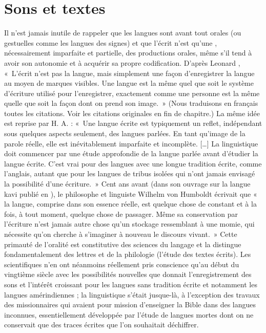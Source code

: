 \section{Sons et textes}\label{sec:1.1.2}

Il n’est jamais inutile de rappeler que les langues sont avant tout orales (ou gestuelles comme les langues des signes) et que l’écrit n’est qu’une , nécessairement imparfaite et partielle, des productions orales, même s’il tend à avoir son autonomie et à acquérir sa propre codification. D’après Leonard \citet{bloomfield1933language}, «~L’écrit n’est pas la langue, mais simplement une façon d’enregistrer la langue au moyen de marques visibles. Une langue est la même quel que soit le système d’écriture utilisé pour l’enregistrer, exactement comme une personne est la même quelle que soit la façon dont on prend son image.~» (Nous traduisons en français toutes les citations. Voir les citations originales en fin de chapitre.) La même idée est reprise par H. A. \citet{gleason1955introduction} : «~Une langue écrite est typiquement un reflet, indépendant sous quelques aspects seulement, des langues parlées. En tant qu’image de la parole réelle, elle est inévitablement imparfaite et incomplète. […] La linguistique doit commencer par une étude approfondie de la langue parlée avant d’étudier la langue écrite. C’est vrai pour des langues avec une longue tradition écrite, comme l’anglais, autant que pour les langues de tribus isolées qui n’ont jamais envisagé la possibilité d’une écriture.~» Cent ans avant (dans son ouvrage sur la langue kavi publié en \citeyear{humboldt1836uber}), le philosophe et linguiste Wilhelm von Humboldt écrivait que « la langue, comprise dans son essence réelle, est quelque chose de constant et à la fois, à tout moment, quelque chose de passager. Même sa conservation par l’écriture n’est jamais autre chose qu’un stockage ressemblant à une momie, qui nécessite qu’on cherche à s’imaginer à nouveau le discours vivant.~» Cette primauté de l’oralité est constitutive des sciences du langage et la distingue fondamentalement des lettres et de la philologie (l’étude des textes écrits). Les scientifiques n’en ont néanmoins réellement pris conscience qu’au début du vingtième siècle avec les possibilités nouvelles que donnait l’enregistrement des sons et l’intérêt croissant pour les langues sans tradition écrite et notamment les langues amérindiennes ; la linguistique s’était jusque-là, à l’exception des travaux des missionnaires qui avaient pour mission d’enseigner la Bible dans des langues inconnues, essentiellement développée par l’étude de langues mortes dont on ne conservait que des traces écrites que l’on souhaitait déchiffrer.

